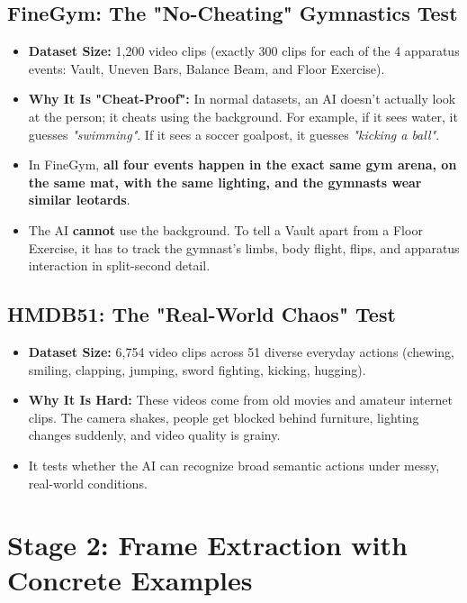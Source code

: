 \documentclass[a4paper, 11pt]{article}
\begin{document}
\subsection{FineGym: The "No-Cheating" Gymnastics Test}
\begin{itemize}
    \item \textbf{Dataset Size:} 1,200 video clips (exactly 300 clips for each of the 4 apparatus events: Vault, Uneven Bars, Balance Beam, and Floor Exercise).
    \item \textbf{Why It Is "Cheat-Proof":} In normal datasets, an AI doesn't actually look at the person; it cheats using the background. For example, if it sees water, it guesses \textit{"swimming"}. If it sees a soccer goalpost, it guesses \textit{"kicking a ball"}.
    \item In FineGym, \textbf{all four events happen in the exact same gym arena, on the same mat, with the same lighting, and the gymnasts wear similar leotards}. 
    \item The AI \textbf{cannot} use the background. To tell a Vault apart from a Floor Exercise, it has to track the gymnast's limbs, body flight, flips, and apparatus interaction in split-second detail.
\end{itemize}

\subsection{HMDB51: The "Real-World Chaos" Test}
\begin{itemize}
    \item \textbf{Dataset Size:} 6,754 video clips across 51 diverse everyday actions (chewing, smiling, clapping, jumping, sword fighting, kicking, hugging).
    \item \textbf{Why It Is Hard:} These videos come from old movies and amateur internet clips. The camera shakes, people get blocked behind furniture, lighting changes suddenly, and video quality is grainy.
    \item It tests whether the AI can recognize broad semantic actions under messy, real-world conditions.
\end{itemize}

\section{Stage 2: Frame Extraction with Concrete Examples}
\end{document}
